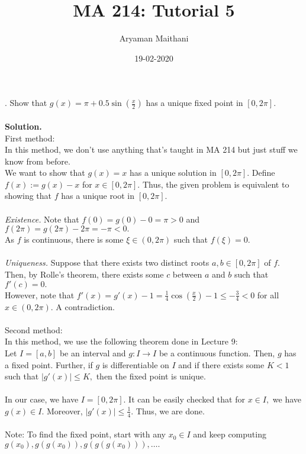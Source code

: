 \documentclass{article}
\title{MA 214: Tutorial 5}
\author{Aryaman Maithani}
\date{19-02-2020}
\begin{document}
. Show that $g(x) = \pi + 0.5\sin\left(\frac{x}{2}\right)$ has a unique fixed point in $[0, 2\pi].$\\~\\
\textbf{Solution.}\\
First method:\\
In this method, we don't use anything that's taught in MA 214 but just stuff we know from before.\\
We want to show that $g(x) = x$ has a unique solution in $[0, 2\pi].$ Define $f(x) := g(x) - x$ for $x \in [0, 2\pi].$ Thus, the given problem is equivalent to showing that $f$ has a unique root in $[0, 2\pi].$\\~\\
\emph{Existence.} Note that $f(0) = g(0) - 0 = \pi > 0$ and $f(2\pi) = g(2\pi) - 2\pi = -\pi < 0.$\\
As $f$ is continuous, there is some $\xi \in (0, 2\pi)$ such that $f(\xi) = 0.$\\~\\
\emph{Uniqueness.} Suppose that there exists two distinct roots $a, b \in [0, 2\pi]$ of $f.$ Then, by Rolle's theorem, there exists some $c$ between $a$ and $b$ such that $f'(c) = 0.$\\
However, note that $f'(x) = g'(x) - 1 = \frac{1}{4}\cos\left(\frac{x}{2}\right)-1 \le -\frac{3}{4} < 0$ for all $x \in (0, 2\pi).$ A contradiction.\\~\\
Second method:\\
In this method, we use the following theorem done in Lecture 9:\\
Let $I = [a, b]$ be an interval and $g:I\to I$ be a continuous function. Then, $g$ has a fixed point. Further, if $g$ is differentiable on $I$ and if there exists some $K < 1$ such that $|g'(x)| \le K,$ then the fixed point is unique.\\~\\
In our case, we have $I = [0, 2\pi].$  It can be easily checked that for $x \in I,$ we have $g(x) \in I.$ Moreover, $|g'(x)| \le \frac{1}{4}.$ Thus, we are done.
\\~\\
Note: To find the fixed point, start with any $x_0 \in I$ and keep computing $g(x_0), g(g(x_0)), g(g(g(x_0))), \ldots.$
\end{document}
